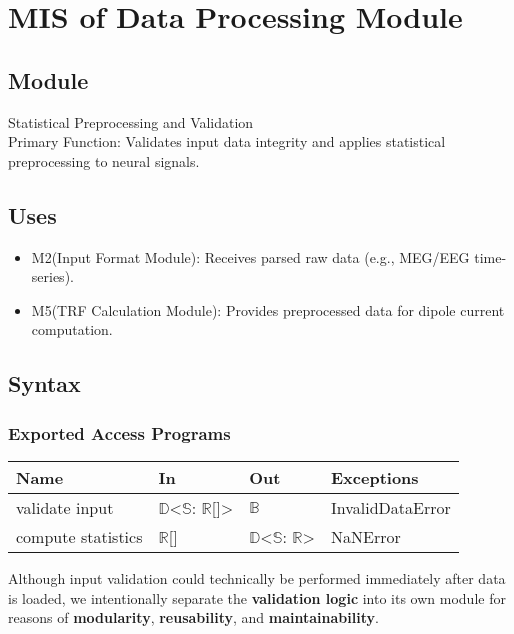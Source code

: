 \documentclass[12pt, titlepage]{article}
\begin{document}
\section{MIS of Data Processing Module}

\subsection{Module}

Statistical Preprocessing and Validation\\
Primary Function: Validates input data integrity and applies statistical preprocessing to neural signals.
\subsection{Uses}

\begin{itemize}
\item M2(Input Format Module): Receives parsed raw data (e.g., MEG/EEG time-series).


\item M5(TRF Calculation Module): Provides preprocessed data for dipole current computation.


\end{itemize}



\subsection{Syntax}


\subsubsection{Exported Access Programs}

\begin{center}
\begin{tabular}{p{2cm} p{4cm} p{4cm} p{2cm}}
\hline
\textbf{Name} & \textbf{In} & \textbf{Out} & \textbf{Exceptions} \\
\hline
validate input & $\mathbb{D}$<$\mathbb{S}$: $\mathbb{R}$[]> & $\mathbb{B}$ & InvalidDataError \\
compute statistics & $\mathbb{R}$[] & $\mathbb{D}$<$\mathbb{S}$: $\mathbb{R}$> & NaNError \\

\hline
\end{tabular}
\end{center}

Although input validation could technically be performed immediately after data is loaded, we intentionally separate the \textbf{validation logic} into its own module for reasons of \textbf{modularity}, \textbf{reusability}, and \textbf{maintainability}.
\end{document}
